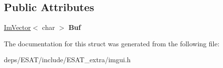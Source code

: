 \subsection*{Public Attributes}
\begin{DoxyCompactItemize}
\item 
\mbox{\label{struct_im_gui_text_buffer_aa6de034b1920cdae5505cc58abf14240}} 
\mbox{\hyperlink{class_im_vector}{Im\+Vector}}$<$ char $>$ {\bfseries Buf}
\end{DoxyCompactItemize}


The documentation for this struct was generated from the following file\+:\begin{DoxyCompactItemize}
\item 
deps/\+E\+S\+A\+T/include/\+E\+S\+A\+T\+\_\+extra/imgui.\+h\end{DoxyCompactItemize}
